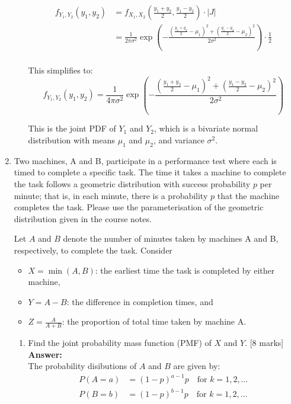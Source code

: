 \documentclass[12pt]{article}
\begin{document}
\begin{enumerate}
\begin{enumerate}
\begin{align*}
f_{Y_1, Y_2}(y_1, y_2) &= f_{X_1, X_2}\left(\frac{y_1 + y_2}{2}, \frac{y_1 - y_2}{2}\right) \cdot \left|J\right| \\
&= \frac{1}{2\pi \sigma^2} \exp\left(-\frac{\left(\frac{y_1 + y_2}{2} - \mu_1\right)^2 + \left(\frac{y_1 - y_2}{2} - \mu_2\right)^2}{2\sigma^2}\right) \cdot \frac{1}{2} \\
\end{align*}

This simplifies to:
\[
\boxed{f_{Y_1, Y_2}(y_1, y_2) = \frac{1}{4\pi \sigma^2} \exp\left(-\frac{\left(\frac{y_1 + y_2}{2} - \mu_1\right)^2 + \left(\frac{y_1 - y_2}{2} - \mu_2\right)^2}{2\sigma^2}\right)}
\]

This is the joint PDF of $Y_1$ and $Y_2$, which is a bivariate normal distribution with means $\mu_1$ and $\mu_2$, and variance $\sigma^2$.
%

\end{enumerate}

\vspace{5pt}
\item 
Two machines, A and B, participate in a performance test where each is timed to complete a specific task. The time it takes a machine to complete the task follows a geometric distribution with success probability $p$ per minute; that is, in each minute, there is a probability $p$ that the machine completes the task. Please use the parameterisation of the geometric distribution given in the course notes.  

Let $A$ and $B$ denote the number of minutes taken by machines A and B, respectively, to complete the task. Consider
\begin{itemize}
\item $X=\min(A, B)$: the earliest time the task is completed by either machine,
\item $Y = A-B$: the difference in completion times, and 
\item $Z = \frac{A}{A+B}$: the proportion of total time taken by machine A.
\end{itemize}
 
\begin{enumerate}
\item Find the joint probability mass function (PMF) of $X$ and $Y$. 
			\hfill [8 marks]
%
\\
\textbf{Answer:}
\\
The probability disibutions of $A$ and $B$ are given by:
\begin{align*}
P(A=a) &= (1-p)^{a-1}p \quad \text{for } k=1,2,\ldots \\
P(B=b) &= (1-p)^{b-1}p \quad \text{for } k=1,2,\ldots
\end{align*}


\end{enumerate}
\end{enumerate}
\end{document}
